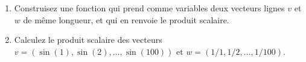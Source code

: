 \begin{exercice}\label{exoMatlab0034}

\begin{enumerate}
\item Construisez une fonction qui prend comme variables deux vecteurs lignes $v$ et $w$ de même longueur, et qui en renvoie le produit scalaire.
\item Calculez le produit scalaire des vecteurs $v=(\sin(1), \sin(2), \dots, \sin(100))$ et $w=(1/1, 1/2, \dots, 1/100)$.
\end{enumerate}

\end{exercice}
